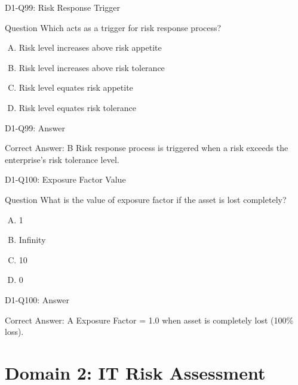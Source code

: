 \documentclass{beamer}
\begin{document}
	\begin{frame}{D1-Q99: Risk Response Trigger}
		\begin{block}{Question}
			Which acts as a trigger for risk response process?
		\end{block}
		\begin{enumerate}[(A)]
			\item Risk level increases above risk appetite
			\item Risk level increases above risk tolerance
			\item Risk level equates risk appetite
			\item Risk level equates risk tolerance
		\end{enumerate}
	\end{frame}
	\begin{frame}{D1-Q99: Answer}
		\begin{block}{Correct Answer: B}
			Risk response process is triggered when a risk exceeds the enterprise's risk tolerance level.
		\end{block}
	\end{frame}
	
	\begin{frame}{D1-Q100: Exposure Factor Value}
		\begin{block}{Question}
			What is the value of exposure factor if the asset is lost completely?
		\end{block}
		\begin{enumerate}[(A)]
			\item 1
			\item Infinity
			\item 10
			\item 0
		\end{enumerate}
	\end{frame}
	\begin{frame}{D1-Q100: Answer}
		\begin{block}{Correct Answer: A}
			Exposure Factor = 1.0 when asset is completely lost (100\% loss).
		\end{block}
	\end{frame}
	
	\section{Domain 2: IT Risk Assessment}
	
\end{document}
